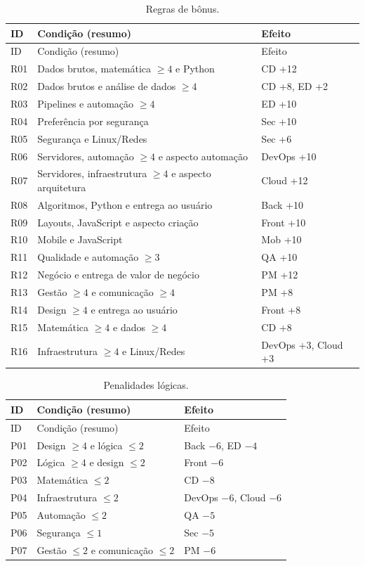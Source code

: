\documentclass[12pt,a4paper]{article}
\begin{document}
\begin{longtable}{@{}p{1.1cm}p{8.6cm}p{4.2cm}@{}}
\caption{Regras de b\^onus.}\label{tab:regras}\\
\toprule
ID & Condi\c{c}\~ao (resumo) & Efeito \\
\midrule
\endfirsthead
\toprule
ID & Condi\c{c}\~ao (resumo) & Efeito \\
\midrule
\endhead
\bottomrule
\endfoot
R01 & Dados brutos, matem\'atica $\geq 4$ e Python & CD +12 \\
R02 & Dados brutos e an\'alise de dados $\geq 4$ & CD +8, ED +2 \\
R03 & Pipelines e automa\c{c}\~ao $\geq 4$ & ED +10 \\
R04 & Prefer\^encia por seguran\c{c}a & Sec +10 \\
R05 & Seguran\c{c}a e Linux/Redes & Sec +6 \\
R06 & Servidores, automa\c{c}\~ao $\geq 4$ e aspecto automa\c{c}\~ao & DevOps +10 \\
R07 & Servidores, infraestrutura $\geq 4$ e aspecto arquitetura & Cloud +12 \\
R08 & Algoritmos, Python e entrega ao usu\'ario & Back +10 \\
R09 & Layouts, JavaScript e aspecto cria\c{c}\~ao & Front +10 \\
R10 & Mobile e JavaScript & Mob +10 \\
R11 & Qualidade e automa\c{c}\~ao $\geq 3$ & QA +10 \\
R12 & Neg\'ocio e entrega de valor de neg\'ocio & PM +12 \\
R13 & Gest\~ao $\geq 4$ e comunica\c{c}\~ao $\geq 4$ & PM +8 \\
R14 & Design $\geq 4$ e entrega ao usu\'ario & Front +8 \\
R15 & Matem\'atica $\geq 4$ e dados $\geq 4$ & CD +8 \\
R16 & Infraestrutura $\geq 4$ e Linux/Redes & DevOps +3, Cloud +3 \\
\end{longtable}

\begin{longtable}{@{}p{1.1cm}p{8.6cm}p{4.2cm}@{}}
\caption{Penalidades l\'ogicas.}\label{tab:penalidades}\\
\toprule
ID & Condi\c{c}\~ao (resumo) & Efeito \\
\midrule
\endfirsthead
\toprule
ID & Condi\c{c}\~ao (resumo) & Efeito \\
\midrule
\endhead
\bottomrule
\endfoot
P01 & Design $\geq 4$ e l\'ogica $\leq 2$ & Back $-6$, ED $-4$ \\
P02 & L\'ogica $\geq 4$ e design $\leq 2$ & Front $-6$ \\
P03 & Matem\'atica $\leq 2$ & CD $-8$ \\
P04 & Infraestrutura $\leq 2$ & DevOps $-6$, Cloud $-6$ \\
P05 & Automa\c{c}\~ao $\leq 2$ & QA $-5$ \\
P06 & Seguran\c{c}a $\leq 1$ & Sec $-5$ \\
P07 & Gest\~ao $\leq 2$ e comunica\c{c}\~ao $\leq 2$ & PM $-6$ \\
\end{longtable}
\end{document}
